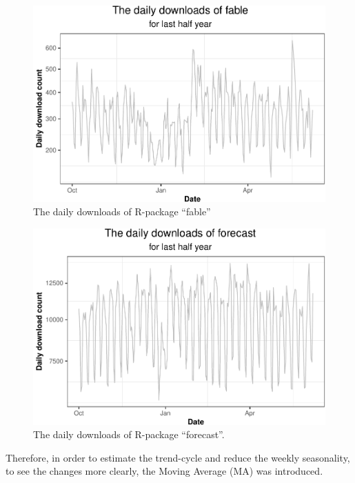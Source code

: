 \documentclass[
]{book}
\begin{document}
\begin{figure}

{\centering \includegraphics{figures/daily-fbl-1} 

}

\caption{The daily downloads of R-package ``fable''}\label{fig:daily-fbl}
\end{figure}



\begin{figure}

{\centering \includegraphics{figures/daily-fcst-1} 

}

\caption{The daily downloads of R-package ``forecast''.}\label{fig:daily-fcst}
\end{figure}

Therefore, in order to estimate the trend-cycle and reduce the weekly seasonality, to see the changes more clearly, the Moving Average (MA) was introduced\citep{movingaverage}.
\end{document}
